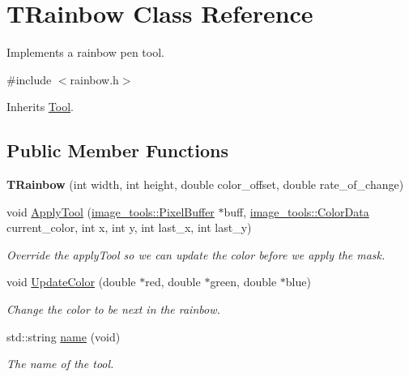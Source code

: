 \hypertarget{classTRainbow}{}\section{T\+Rainbow Class Reference}
\label{classTRainbow}


Implements a rainbow pen tool.  




{\ttfamily \#include $<$rainbow.\+h$>$}



Inherits \hyperlink{classTool}{Tool}.

\subsection*{Public Member Functions}
\begin{DoxyCompactItemize}
\item 
{\bfseries T\+Rainbow} (int width, int height, double color\+\_\+offset, double rate\+\_\+of\+\_\+change)\hypertarget{classTRainbow_a262643d0c7b482779a0dd3e06fbcf04a}{}\label{classTRainbow_a262643d0c7b482779a0dd3e06fbcf04a}

\item 
void \hyperlink{classTRainbow_a9a2122d932a8df785b715b3cafd3b3a7}{Apply\+Tool} (\hyperlink{classimage__tools_1_1PixelBuffer}{image\+\_\+tools\+::\+Pixel\+Buffer} $\ast$buff, \hyperlink{classimage__tools_1_1ColorData}{image\+\_\+tools\+::\+Color\+Data} current\+\_\+color, int x, int y, int last\+\_\+x, int last\+\_\+y)\hypertarget{classTRainbow_a9a2122d932a8df785b715b3cafd3b3a7}{}\label{classTRainbow_a9a2122d932a8df785b715b3cafd3b3a7}

\begin{DoxyCompactList}\small\item\em Override the apply\+Tool so we can update the color before we apply the mask. \end{DoxyCompactList}\item 
void \hyperlink{classTRainbow_ac92a0ba45189665c678fdb04e6ecab30}{Update\+Color} (double $\ast$red, double $\ast$green, double $\ast$blue)
\begin{DoxyCompactList}\small\item\em Change the color to be next in the rainbow. \end{DoxyCompactList}\item 
std\+::string \hyperlink{classTRainbow_a1eef09ba9059714fcf02e1830988ad41}{name} (void)
\begin{DoxyCompactList}\small\item\em The name of the tool. \end{DoxyCompactList}\end{DoxyCompactItemize}
